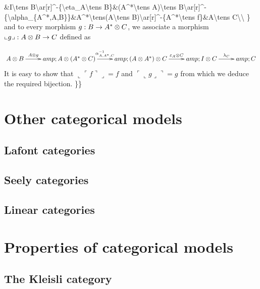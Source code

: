 \&I\textbackslash{}tens
B\textbackslash{}ar{[}r{]}\^{}-\{\textbackslash{}eta\_A\textbackslash{}tens
B\}\&(A\^{}*\textbackslash{}tens A)\textbackslash{}tens
B\textbackslash{}ar{[}r{]}\^{}-\{\textbackslash{}alpha\_\{A\^{}*,A,B\}\}\&A\^{}*\textbackslash{}tens(A\textbackslash{}tens
B)\textbackslash{}ar{[}r{]}\^{}-\{A\^{}*\textbackslash{}tens
f\}\&A\textbackslash{}tens C\textbackslash{}\textbackslash{} \} and to
every morphism \(g:B\to A^*\otimes C\), we associate a morphism
\(\llcorner g\lrcorner:A\otimes B\to C\) defined as

\[\xymatrix{
A\tens B\ar[r]^-{A\tens g}&amp;A\tens(A^*\tens C)\ar[r]^-{\alpha_{A,A^*,C}^{-1}}&amp;(A\tens A^*)\tens C\ar[r]^-{\varepsilon_A\tens C}&amp;I\tens C\ar[r]^-{\lambda_C}&amp;C
}\] It is easy to show that
\(\llcorner \ulcorner f\urcorner\lrcorner=f\) and
\(\ulcorner\llcorner g\lrcorner\urcorner=g\) from which we deduce the
required bijection. \}\}

\section{Other categorical models}\label{other-categorical-models}

\subsection{Lafont categories}\label{lafont-categories}

\subsection{Seely categories}\label{seely-categories}

\subsection{Linear categories}\label{linear-categories}

\section{Properties of categorical models}\label{properties-of-categorical-models}

\subsection{The Kleisli category}\label{the-kleisli-category}


